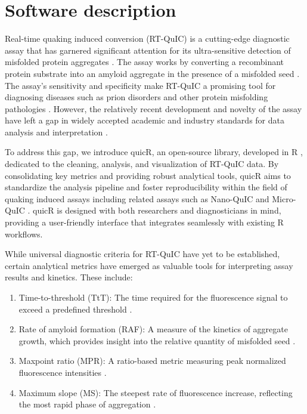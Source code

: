 \documentclass[preprint,12pt, a4paper]{elsarticle}
\begin{document}
\section{Software description}

    Real-time quaking induced conversion (RT-QuIC) is a cutting-edge diagnostic assay that has garnered significant attention for its ultra-sensitive detection of misfolded protein aggregates \cite{Wilham2010, Atarashi2011}. The assay works by converting a recombinant protein substrate into an amyloid aggregate in the presence of a misfolded seed \cite{Wilham2010, Orru2012, Orru2017, Orru2015, Bongianni2019, Dassanayake2016, Hwang2018, Groveman2018, Metrick2020}. The assay's sensitivity and specificity make RT-QuIC a promising tool for diagnosing diseases such as prion disorders and other protein misfolding pathologies \cite{Fiorini2020, Franceschini2017, Picasso-Risso2022, Holz2021}. However, the relatively recent development and novelty of the assay have left a gap in widely accepted academic and industry standards for data analysis and interpretation \cite{Rowden2023}.

    To address this gap, we introduce quicR, an open-source library, developed in R \cite{R2024}, dedicated to the cleaning, analysis, and visualization of RT-QuIC data. By consolidating key metrics and providing robust analytical tools, quicR aims to standardize the analysis pipeline and foster reproducibility within the field of quaking induced assays including related assays such as Nano-QuIC \cite{Christenson2023} and Micro-QuIC \cite{Lee2024}. quicR is designed with both researchers and diagnosticians in mind, providing a user-friendly interface that integrates seamlessly with existing R workflows.

    While universal diagnostic criteria for RT-QuIC have yet to be established, certain analytical metrics have emerged as valuable tools for interpreting assay results and kinetics. These include:

    \begin{enumerate}
        \item Time-to-threshold (TtT): The time required for the fluorescence signal to exceed a predefined threshold \cite{Orru2015}.
        \item Rate of amyloid formation (RAF): A measure of the kinetics of aggregate growth, which provides insight into the relative quantity of misfolded seed \cite{Gallups2022}.
        \item Maxpoint ratio (MPR): A ratio-based metric measuring peak normalized fluorescence intensities \cite{Rowden2023}.
        \item Maximum slope (MS): The steepest rate of fluorescence increase, reflecting the most rapid phase of aggregation \cite{Henderson2015}.
    \end{enumerate}
\end{document}
